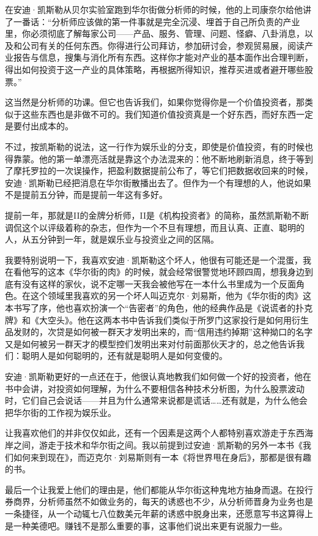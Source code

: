 在安迪·凯斯勒从贝尔实验室跑到华尔街做分析师的时候，他的上司康奈尔给他讲了一番话：``分析师应该做的第一件事就是完全沉浸、埋首于自己所负责的产业里，你必须彻底了解每家公司------产品、服务、管理、问题、怪癖、八卦消息，以及和公司有关的任何东西。你得进行公司拜访，参加研讨会，参观贸易展，阅读产业报告与信息，搜集与消化所有东西。这样你才能对产业的基本面作出合理判断，得出如何投资于这一产业的具体策略，再根据所得知识，推荐买进或者避开哪些股票。''

这当然是分析师的功课。但它也告诉我们，如果你觉得你是一个价值投资者，那类似于这些东西也是非做不可的。我们知道价值投资真是一个好东西，而好东西一定是要付出成本的。

不过，按凯斯勒的说法，这一行作为娱乐业的分支，即使是价值投资，有的时候也得靠蒙。他的第一单漂亮活就是靠这个办法混来的：他不断地刷新消息，终于等到了摩托罗拉的一次误操作，把盈利数据提前公布了，等它们把数据收回来的时候，安迪·凯斯勒已经把消息在华尔街散播出去了。但作为一个有理想的人，他说如果不是提前五分钟，而是提前一年这有多好。

提前一年，那就是II的金牌分析师，II是《机构投资者》的简称，虽然凯斯勒不断调侃这个以评级着称的杂志，但作为一个不旦有理想，而且认真、正直、聪明的人，从五分钟到一年，就是娱乐业与投资业之间的区隔。

我要特别说明一下，我喜欢安迪·凯斯勒这个坏人，他很有可能还是一个混蛋，我在看他写的这本《华尔街的肉》的时候，就会经常很警觉地环顾四周，想我身边到底有没有这样的家伙，说不定哪一天我会被他写在一本什么书里成为一个反面角色。在这个领域里我喜欢的另一个坏人叫迈克尔·刘易斯，他为《华尔街的肉》这本书写了序，他也喜欢扮演一个``告密者''的角色，他的经典作品是《说谎者的扑克牌》和《大空头》。他在这两本书中告诉我们类似于所罗门这家投行是如何用衍生品发财的，次贷是如何被一群天才发明出来的，而``信用违约掉期''这种拗口的名字又是如何被另一群天才的模型控们发明出来对付前面那伙天才的，总之他告诉我们：聪明人是如何聪明的，还有就是聪明人是如何变傻的。

安迪·凯斯勒更好的一点还在于，他很认真地教我们如何做一个好的投资者，他在书中会讲，对投资如何理解，为什么不要相信各种技术分析图，为什么股票波动时，它们自己会说话------并且为什么通常来说都是谎话\ldots\ldots 还有就是，为什么他会把华尔街的工作视为娱乐业。

让我喜欢他们的并非仅仅如此，还有一个因素是这两个人都特别喜欢游走于东西海岸之间，游走于技术和华尔街之间。我以前提到过安迪·凯斯勒的另外一本书《我们如何来到现在》，而迈克尔·刘易斯则有一本《将世界甩在身后》，那都是很有趣的书。

最后一个让我爱上他们的理由是，他们都能从华尔街这种鬼地方抽身而退。在投行券商界，分析师虽然不如做业务的，每天的诱惑也不少，从分析师晋身为业务也是一条捷径，从一个动辄七八位数美元年薪的诱惑中脱身出来，还愿意写书这算得上是一种美德吧。赚钱不是那么重要的事，这事他们说出来更有说服力一些。


